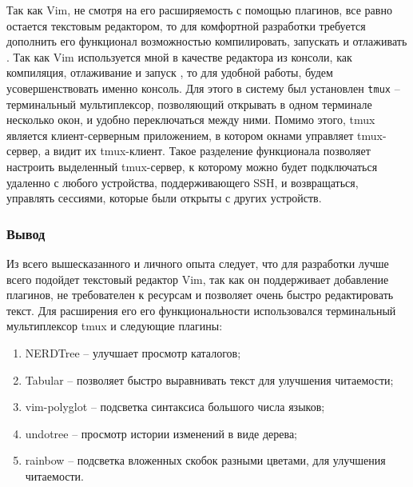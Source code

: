 Так как Vim, не смотря на его расширяемость с помощью плагинов, все равно остается текстовым редактором,
то для комфортной разработки требуется дополнить его функционал возможностью компилировать, 
запускать и отлаживать {\ProgModule}. Так как Vim используется мной в качестве редактора из
консоли, как компиляция, отлаживание и запуск {\ProgModule}, то для удобной работы, будем 
усовершенствовать именно консоль.
Для этого в систему был установлен \verb|tmux| -- терминальный мультиплексор,
позволяющий открывать в одном терминале несколько окон, и удобно переключаться
между ними. Помимо этого, tmux является клиент-серверным приложением, в котором
окнами управляет tmux-сервер, а видит их tmux-клиент. Такое разделение
функционала позволяет настроить выделенный tmux-сервер, к которому можно будет
подключаться удаленно с любого устройства, поддерживающего SSH, и возвращаться,
управлять сессиями, которые были открыты с других устройств.

\subsubsection{Вывод}\label{sec:ch2/sec1/sub1/sub4}
Из всего вышесказанного и личного опыта следует, 
что для разработки {\ProgModule} лучше всего подойдет текстовый редактор Vim,
так как он поддерживает добавление плагинов, не требователен к ресурсам и позволяет
очень быстро редактировать текст. Для расширения его его функциональности использовался
терминальный мультиплексор tmux и следующие плагины:
\begin{enumerate}[label={\arabic*)}]
    \item NERDTree \autocite{nerdtree} -- улучшает просмотр каталогов;
    \item Tabular \autocite{tabular} -- позволяет быстро выравнивать текст
        для улучшения читаемости;
    \item vim-polyglot \autocite{vim-polyglot} -- подсветка синтаксиса большого
        числа языков;
    \item undotree \autocite{undotree} -- просмотр истории изменений в виде дерева;
    \item rainbow \autocite{rainbow} -- подсветка вложенных скобок разными цветами,
        для улучшения читаемости.
\end{enumerate}


